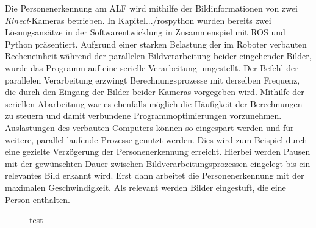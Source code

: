 	Die Personenerkennung am ALF wird mithilfe der Bildinformationen von zwei \textit{Kinect}-Kameras betrieben. In Kapitel.../rospython wurden bereits zwei Lösungsansätze in der Softwarentwicklung in Zusammenspiel mit ROS und Python präsentiert. Aufgrund einer starken Belastung der im Roboter verbauten Recheneinheit während der parallelen Bildverarbeitung beider eingehender Bilder, wurde das Programm auf eine serielle Verarbeitung umgestellt. Der Befehl der parallelen Verarbeitung erzwingt Berechnungsprozesse mit derselben Frequenz, die durch den Eingang der Bilder beider Kameras vorgegeben wird. Mithilfe der seriellen Abarbeitung  war es ebenfalls möglich die Häufigkeit der Berechnungen zu steuern und damit verbundene Programmoptimierungen vorzunehmen. Auslastungen des verbauten Computers können so eingespart werden und für weitere, parallel laufende Prozesse genutzt werden. Dies wird zum Beispiel durch eine gezielte Verzögerung der Personenerkennung erreicht. Hierbei werden Pausen mit der gewünschten Dauer zwischen Bildverarbeitungsprozessen eingelegt bis ein relevantes Bild erkannt wird. Erst dann arbeitet die Personenerkennung mit der maximalen Geschwindigkeit. Als relevant werden Bilder eingestuft, die eine Person enthalten.\\
	
	\begin{figure}[H]
		\centering
		\caption{test}
	\end{figure}

